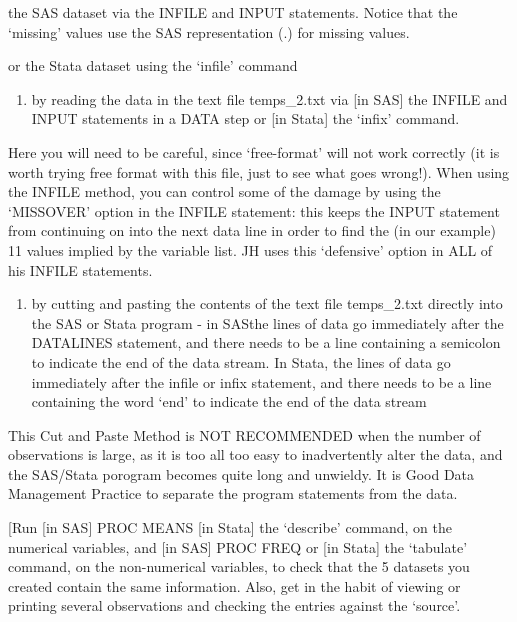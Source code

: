 \documentclass[]{book}
\providecommand{\tightlist}{%
  \setlength{\itemsep}{0pt}\setlength{\parskip}{0pt}}
\begin{document}
the SAS dataset via the INFILE and INPUT statements. Notice that the `missing' values use the SAS representation (.) for missing values.

or the Stata dataset using the `infile' command

\begin{enumerate}
\def\labelenumi{(\roman{enumi})}
\setcounter{enumi}{3}
\tightlist
\item
  by reading the data in the text file temps\_2.txt via {[}in SAS{]} the INFILE and INPUT statements in a DATA step or {[}in Stata{]} the `infix' command.
\end{enumerate}

Here you will need to be careful, since `free-format' will not work correctly (it is worth trying free format with this file, just to see what goes wrong!). When using the INFILE method, you can control some of the damage by using the `MISSOVER' option in the INFILE statement: this keeps the INPUT statement from continuing on into the next data line in order to find the (in our example) 11 values implied by the variable list. JH uses this `defensive' option in ALL of his INFILE statements.

\begin{enumerate}
\def\labelenumi{(\alph{enumi})}
\setcounter{enumi}{21}
\tightlist
\item
  by cutting and pasting the contents of the text file temps\_2.txt directly into the SAS or Stata program - in SASthe lines of data go immediately after the DATALINES statement, and there needs to be a line containing a semicolon to indicate the end of the data stream. In Stata, the lines of data go immediately after the infile or infix statement, and there needs to be a line containing the word `end' to indicate the end of the data stream
\end{enumerate}

This Cut and Paste Method is NOT RECOMMENDED when the number of observations is large, as it is too all too easy to inadvertently alter the data, and the SAS/Stata porogram becomes quite long and unwieldy. It is Good Data Management Practice to separate the program statements from the data.

{[}Run {[}in SAS{]} PROC MEANS {[}in Stata{]} the `describe' command, on the numerical variables, and {[}in SAS{]} PROC FREQ or {[}in Stata{]} the `tabulate' command, on the non-numerical variables, to check that the 5 datasets you created contain the same information. Also, get in the habit of viewing or printing several observations and checking the entries against the `source'.
\end{document}
